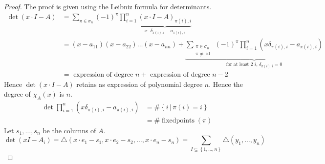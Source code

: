 \documentclass[a4paper]{article}
\numberwithin{lecref}{section}
\newcommand{\set}[1]{\left\{#1\right\}}
\newcommand{\setdef}[2]{\left\{\left.#1\,\right|\,#2\right\}}
\begin{document}
\begin{proof}
  The proof is given using the Leibniz formula for determinants.
  \begin{align*}
    \det(x \cdot I - A) &= \sum_{\pi \in \sigma_n} (-1)^\pi \prod_{i=1}^n \underbrace{(x \cdot I - A)_{\pi(i),i}}_{x \cdot \delta_{\pi(i),i} - a_{\pi(i),i}} \\
      &= (x - a_{11})(x - a_{22}) \dots (x - a_{nn}) +
        \underbrace{
          \sum_{\substack{\pi \in \sigma_n \\ \pi \neq \operatorname{id}}}
          (-1)^\pi \prod_{i=1}^n
          \left(x \delta_{\pi(i),i} - a_{\pi(i),i}\right)
        }_{\text{for at least 2 $i$, $\delta_{\pi(i),i} = 0$}} \\
      &= \text{ expression of degree } n + \text{ expression of degree } n -2
  \end{align*}
  Hence $\det(x \cdot I - A)$ retains as expression of polynomial degree $n$. Hence the degree of $\chi_A(x)$ is $n$.
  \begin{align*}
    \det{\prod_{i=1}^n (x \delta_{\pi(i),i} - a_{\pi(i),i})} &= \#\setdef{i}{\pi(i) = i} \\
      &= \#\operatorname{fixedpoints}(\pi)
  \end{align*}
  Let $s_1, \dots, s_n$ be the columns of $A$.
  \[ \det(xI - A_i) = \triangle(x\cdot e_1 - s_1, x \cdot e_2 - s_2, \dots, x \cdot e_n - s_n) = \sum_{I \subseteq \set{1, \dots, n}} \triangle(y_1, \dots, y_n) \]


\end{proof}
\end{document}
